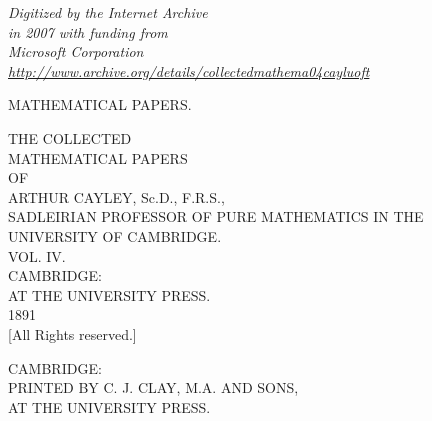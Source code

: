 \documentclass[11pt,a4paper]{book}
\theoremstyle{plain}
\begin{document}
\frontmatter

\thispagestyle{empty}
\mbox{}
\newpage
\thispagestyle{empty}
\begin{center}
\textit{Digitized by the Internet Archive\\
in 2007 with funding from\\
Microsoft Corporation\\[1em]
\url{http://www.archive.org/details/collectedmathema04cayluoft}}
\end{center}
\newpage

\thispagestyle{empty}
\begin{center}
\vspace*{2in}
{\large MATHEMATICAL PAPERS.}
\end{center}
\newpage

\thispagestyle{empty}
\mbox{}
\newpage

\thispagestyle{empty}
\begin{center}
\vspace*{1in}
{\LARGE THE COLLECTED}\\[0.5em]
{\LARGE MATHEMATICAL PAPERS}\\[1em]
{\large OF}\\[1em]
{\LARGE ARTHUR CAYLEY, Sc.D., F.R.S.,}\\[0.5em]
{\normalsize SADLEIRIAN PROFESSOR OF PURE MATHEMATICS IN THE UNIVERSITY OF CAMBRIDGE.}\\[2em]
{\Huge VOL. IV.}\\[2em]
{\large CAMBRIDGE:}\\[0.3em]
{\normalsize AT THE UNIVERSITY PRESS.}\\[1em]
{\normalsize 1891}\\[0.5em]
{\small [All Rights reserved.]}
\end{center}
\newpage

\thispagestyle{empty}
\begin{center}
\vspace*{3in}
{\small CAMBRIDGE:}\\[0.3em]
{\small PRINTED BY C. J. CLAY, M.A. AND SONS,}\\[0.3em]
{\small AT THE UNIVERSITY PRESS.}
\end{center}
\newpage
\end{document}
